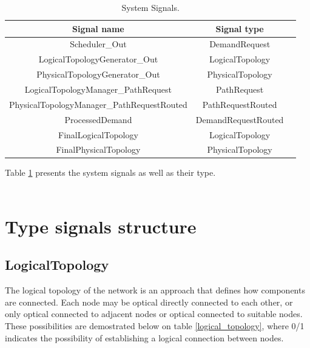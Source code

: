 \begin{table}[H]
	\centering
	\begin{tabular}{| c | c | c |}
		\hline
		 \textbf{Signal name} &  \textbf{Signal type} \\ %
		\hline
		Scheduler\_Out &  DemandRequest\\ \hline
		LogicalTopologyGenerator\_Out &  LogicalTopology\\ \hline
		PhysicalTopologyGenerator\_Out & PhysicalTopology\\ \hline
		LogicalTopologyManager\_PathRequest & PathRequest\\ \hline
		PhysicalTopologyManager\_PathRequestRouted & PathRequestRouted\\ \hline
		ProcessedDemand &  DemandRequestRouted\\ \hline
		FinalLogicalTopology & LogicalTopology\\ \hline
		FinalPhysicalTopology & PhysicalTopology\\ \hline
	\end{tabular}
	\caption{System Signals.}
	\label{system_signals}
\end{table}
	Table \ref{system_signals} presents the system signals as well as their type.\\ \\

\section{Type signals structure}

\subsection{LogicalTopology}

The logical topology of the network is an approach that defines how components are connected. Each node may be optical directly connected to each other, or only optical connected to adjacent nodes or optical connected to suitable nodes. These possibilities are demostrated below on table \ref{logical_topology}, where 0/1 indicates the possibility of establishing a logical connection between nodes.\\ 

